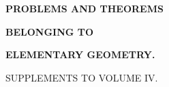 \clearpage{}
\thispagestyle{empty}
\vspace*{4cm}
\begin{center}
\textbf{\Large PROBLEMS AND THEOREMS}\par\medskip
\textbf{BELONGING TO}\par\medskip
\textbf{ELEMENTARY GEOMETRY.}\par\bigskip
SUPPLEMENTS TO VOLUME IV.
\end{center}
\clearpage
